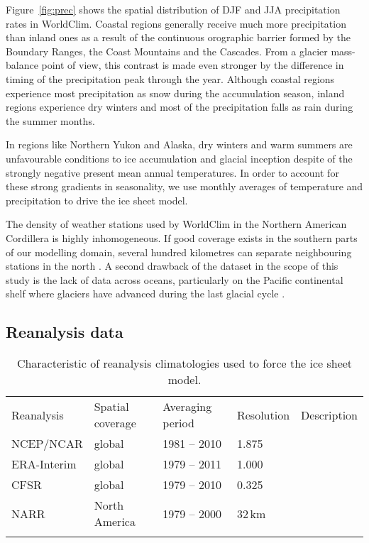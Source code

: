 Figure~\ref{fig:prec} shows the spatial distribution of DJF and JJA precipitation rates in WorldClim. Coastal regions generally receive much more precipitation than inland ones as a result of the continuous orographic barrier formed by the Boundary Ranges, the Coast Mountains and the Cascades. From a glacier mass-balance point of view, this contrast is made even stronger by the difference in timing of the precipitation peak through the year. Although coastal regions experience most precipitation as snow during the accumulation season, inland regions experience dry winters and most of the precipitation falls as rain during the summer months.

In regions like Northern Yukon and Alaska, dry winters and warm summers are unfavourable conditions to ice accumulation and glacial inception despite of the strongly negative present mean annual temperatures. In order to account for these strong gradients in seasonality, we use monthly averages of temperature and precipitation to drive the ice sheet model.

The density of weather stations used by WorldClim in the Northern American Cordillera is highly inhomogeneous. If good coverage exists in the southern parts of our modelling domain, several hundred kilometres can separate neighbouring stations in the north \citep{data:worldclim}. A second drawback of the dataset in the scope of this study is the lack of data across oceans, particularly on the Pacific continental shelf where glaciers have advanced during the last glacial cycle \citep{jackson-clague-1991}.


\subsection{Reanalysis data}

\begin{table*}[t]
	\caption{Characteristic of reanalysis climatologies used to force the ice sheet model.}
	\label{tab:reanalyses}
	\vskip4mm
	\centering
	\begin{tabular}{lllll}
		\tophline
		Reanalysis& Spatial coverage& Averaging period& Resolution& Description\\
		\middlehline
		NCEP/NCAR&  global&     1981 -- 2010& 1.875\degree& \citet{data:ncar}\\
		ERA-Interim&global&     1979 -- 2011& 1.000\degree& \citet{data:erai}\\
		CFSR&       global&     1979 -- 2010& 0.325\degree& \citet{data:cfsr}\\
		NARR&       North America& 1979 -- 2000& 32\,km& \citet{data:narr}\\
		\bottomhline
	\end{tabular}
\end{table*}

